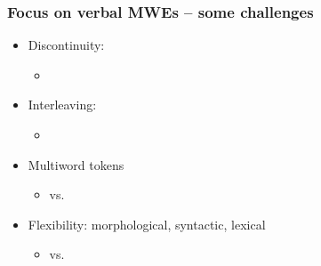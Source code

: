 \documentclass[xcolor=dvipsnames]{beamer}
\begin{document}
\begin{frame}
\begin{scriptsize}
\begin{tabular}{|l|p{5.4cm}|p{1.8cm}|}
\end{tabular}
\end{scriptsize}

\end{frame}

\begin{frame} 
\frametitle{Focus on \textbf{verbal} MWEs -- some challenges}

\begin{scriptsize}
\begin{itemize}
\item Discontinuity:
	\begin{itemize}
	\item[]  
    	\end{itemize}
\item Interleaving:
   	\begin{itemize}
	\item[]   %
	\end{itemize}
\item Multiword tokens
	\begin{itemize}
	\item[]    vs. 
	\end{itemize}
\item Flexibility: morphological, syntactic, lexical
	\begin{itemize}
	\item[]   vs.~
	\end{itemize}
\end{itemize}
\end{scriptsize}

\end{frame}
\end{document}
